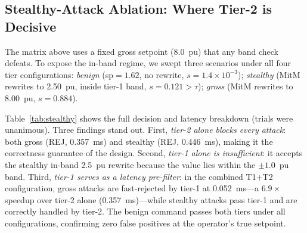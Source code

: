 \documentclass[conference]{IEEEtran}
\begin{document}
\subsection{Stealthy-Attack Ablation: Where Tier-2 is Decisive}
The matrix above uses a fixed gross setpoint (8.0~pu) that any band check defeats. To expose the in-band regime, we swept three scenarios under all four tier configurations: \emph{benign} (sp$=1.62$, no rewrite, $s\!=\!1.4\!\times\!10^{-3}$); \emph{stealthy} (MitM rewrites to 2.50~pu, inside tier-1 band, $s\!=\!0.121\!>\!\tau$); \emph{gross} (MitM rewrites to 8.00~pu, $s\!=\!0.884$).

Table~\ref{tab:stealthy} shows the full decision and latency breakdown (trials were unanimous). Three findings stand out. First, \emph{tier-2 alone blocks every attack}: both gross (REJ, 0.357~ms) and stealthy (REJ, 0.446~ms), making it the correctness guarantee of the design. Second, \emph{tier-1 alone is insufficient}: it accepts the stealthy in-band 2.5~pu rewrite because the value lies within the $\pm1.0$~pu band. Third, \emph{tier-1 serves as a latency pre-filter}: in the combined T1+T2 configuration, gross attacks are fast-rejected by tier-1 at 0.052~ms---a $6.9\times$ speedup over tier-2 alone (0.357~ms)---while stealthy attacks pass tier-1 and are correctly handled by tier-2. The benign command passes both tiers under all configurations, confirming zero false positives at the operator's true setpoint.
\end{document}
